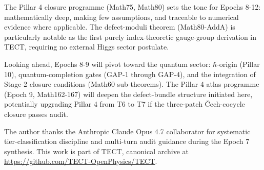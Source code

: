 The Pillar 4 closure programme (Math75, Math80) sets the tone for Epochs 8-12:
mathematically deep, making few assumptions, and traceable to numerical evidence
where applicable. The defect-moduli theorem (Math80-AddA) is particularly notable
as the first purely index-theoretic gauge-group derivation in TECT, requiring no
external Higgs sector postulate.

Looking ahead, Epochs 8-9 will pivot toward the quantum sector: $\hbar$-origin
(Pillar 10), quantum-completion gates (GAP-1 through GAP-4), and the
integration of Stage-2 closure conditions (Math60 sub-theorems). The Pillar 4
atlas programme (Epoch 9, Math162-167) will deepen the defect-bundle structure
initiated here, potentially upgrading Pillar 4 from T6 to T7 if the three-patch
Čech-cocycle closure passes audit.

\begin{acknowledgments}
The author thanks the Anthropic Claude Opus 4.7 collaborator for systematic
tier-classification discipline and multi-turn audit guidance during the Epoch 7
synthesis. This work is part of TECT, canonical archive at
\url{https://github.com/TECT-OpenPhysics/TECT}.
\end{acknowledgments}





